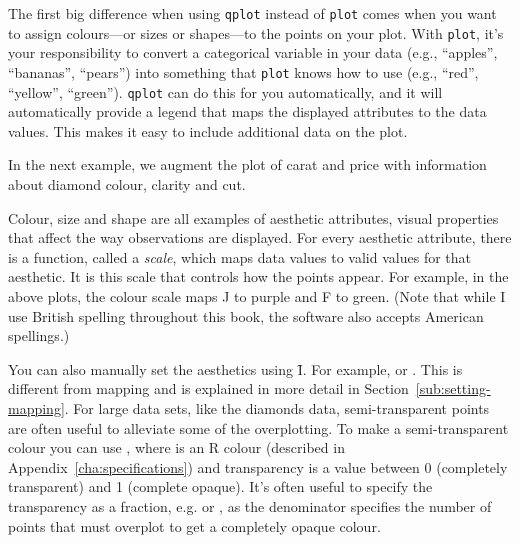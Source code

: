 The first big difference when using {\tt qplot} instead of {\tt plot} comes when you want to assign colours---or sizes or shapes---to the points on your plot.  With {\tt plot}, it's your responsibility to convert a categorical variable in your data (e.g., ``apples'', ``bananas'', ``pears'') into something that {\tt plot} knows how to use (e.g., ``red'', ``yellow'', ``green'').  {\tt qplot} can do this for you automatically, and it will automatically provide a legend that maps the displayed attributes to the data values.  This makes it easy to include additional data on the plot.  

In the next example, we augment the plot of carat and price with information about diamond colour, clarity and cut.

% 


Colour, size and shape are all examples of aesthetic attributes, visual properties that affect the way observations are displayed.  For every aesthetic attribute, there is a function, called a \emph{scale}, which maps data values to valid values for that aesthetic.  It is this scale that controls how the points appear.  For example, in the above plots, the colour scale maps J to purple and F to green. (Note that while I use British spelling throughout this book, the software also accepts American spellings.)

You can also manually set the aesthetics using \f{I}.  For example,  or .  This is different from mapping and is explained in more detail in Section~\ref{sub:setting-mapping}.  For large data sets, like the diamonds data, semi-transparent points are often useful to alleviate some of the overplotting.  To make a semi-transparent colour you can use , where  is an R colour (described in Appendix~\ref{cha:specifications}) and transparency is a value between 0 (completely transparent) and 1 (complete opaque).  It's often useful to specify the transparency as a fraction, e.g.  or , as the denominator specifies the number of points that must overplot to get a completely opaque colour.

